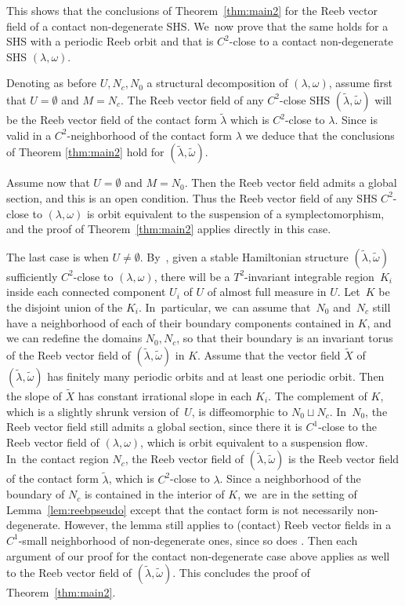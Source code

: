 \documentclass[JEP,XML,SOM,Unicode,NoEqCountersInSection,NoFloatCountersInSection,published]{cedram}
\theoremstyle{definition}
\begin{document}
This shows that the conclusions of Theorem~\ref{thm:main2} for the Reeb vector field of a contact non-degenerate SHS. We~now prove that the same holds for a SHS with a periodic Reeb orbit and that is $C^2$-close to a contact non-degenerate SHS $(\lambda,\omega)$.

Denoting as before $U,N_c, N_0$ a structural decomposition of $(\lambda,\omega)$, assume first that $U=\emptyset$ and $M=N_c$. The Reeb vector field of any $C^2$-close SHS $(\widetilde \lambda, \widetilde \omega)$ will be the Reeb vector field of the contact form $\widetilde \lambda$ which is $C^2$-close to $\lambda$. Since \cite[Th.\,1.2]{CDR} is valid in a $C^2$-neighborhood of the contact form $\lambda$ we deduce that the conclusions of Theorem \ref{thm:main2} hold for $(\widetilde \lambda, \widetilde \omega)$.

Assume now that $U=\emptyset$ and $M=N_0$. Then the Reeb vector field admits a global section, and this is an open condition. Thus the Reeb vector field of any SHS $C^2$-close to $(\lambda,\omega)$ is orbit equivalent to the suspension of a symplectomorphism, and the proof of Theorem~\ref{thm:main2} applies directly in this case.

The last case is when $U\neq \emptyset$. By~\cite[Th.\,3.7]{CV1}, given a stable Hamiltonian structure $(\widetilde \lambda, \widetilde \omega)$ sufficiently $C^2$-close to $(\lambda,\omega)$, there will be a $T^2$-invariant integrable region~$K_i$ inside each connected component $U_i$ of $U$ of almost full measure in $U$. Let~$K$ be the disjoint union of the $K_i$. In~particular, we~can assume that~$N_0$ and~$N_c$ still have a neighborhood of each of their boundary components contained in $K$, and we can redefine the domains $N_0, N_c$, so that their boundary is an invariant torus of the Reeb vector field of $(\widetilde \lambda, \widetilde \omega)$ in $K$. Assume that the vector field $\widetilde X$ of $(\widetilde \lambda, \widetilde \omega)$ has finitely many periodic orbits and at least one periodic orbit. Then the slope of $\widetilde X$ has constant irrational slope in each $K_i$. The complement of $K$, which is a slightly shrunk version of~$U$, is diffeomorphic to $N_0\sqcup N_c$. In~$N_0$, the Reeb vector field still admits a global section, since there it is $C^1$-close to the Reeb vector field of $(\lambda,\omega)$, which is orbit equivalent to a suspension flow. In~the contact region $N_c$, the Reeb vector field of $(\widetilde \lambda, \widetilde \omega)$ is the Reeb vector field of the contact form $\widetilde \lambda$, which is $C^2$-close to $\lambda$. Since a neighborhood of the boundary of $N_c$ is contained in the interior of $K$, we~are in the setting of Lemma~\ref{lem:reebpseudo} except that the contact form is not necessarily non-degenerate. However, the lemma still applies to (contact) Reeb vector fields in a $C^1$-small neighborhood of non-degenerate ones, since so does \cite[Th.\,1.2]{CDR}. Then each argument of our proof for the contact non-degenerate case above applies as well to the Reeb vector field of $(\widetilde \lambda, \widetilde \omega)$. This concludes the proof of Theorem~\ref{thm:main2}.
\end{document}
